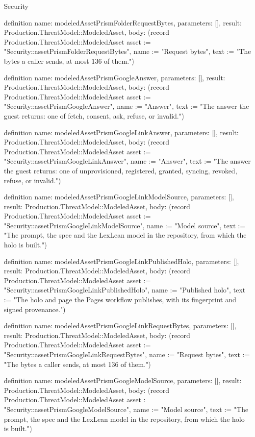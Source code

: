 \begin{lexlean}{Security}
\begin{semanticmodule}
definition{
  name: modeledAssetPrismFolderRequestBytes,
  parameters: [],
  result: Production.ThreatModel::ModeledAsset,
  body: (record Production.ThreatModel::ModeledAsset {asset := "Security::assetPrismFolderRequestBytes", name := "Request bytes", text := "The bytes a caller sends, at most 136 of them."})
}

definition{
  name: modeledAssetPrismGoogleAnswer,
  parameters: [],
  result: Production.ThreatModel::ModeledAsset,
  body: (record Production.ThreatModel::ModeledAsset {asset := "Security::assetPrismGoogleAnswer", name := "Answer", text := "The answer the guest returns: one of fetch, consent, ask, refuse, or invalid."})
}

definition{
  name: modeledAssetPrismGoogleLinkAnswer,
  parameters: [],
  result: Production.ThreatModel::ModeledAsset,
  body: (record Production.ThreatModel::ModeledAsset {asset := "Security::assetPrismGoogleLinkAnswer", name := "Answer", text := "The answer the guest returns: one of unprovisioned, registered, granted, syncing, revoked, refuse, or invalid."})
}

definition{
  name: modeledAssetPrismGoogleLinkModelSource,
  parameters: [],
  result: Production.ThreatModel::ModeledAsset,
  body: (record Production.ThreatModel::ModeledAsset {asset := "Security::assetPrismGoogleLinkModelSource", name := "Model source", text := "The prompt, the spec and the LexLean model in the repository, from which the holo is built."})
}

definition{
  name: modeledAssetPrismGoogleLinkPublishedHolo,
  parameters: [],
  result: Production.ThreatModel::ModeledAsset,
  body: (record Production.ThreatModel::ModeledAsset {asset := "Security::assetPrismGoogleLinkPublishedHolo", name := "Published holo", text := "The holo and page the Pages workflow publishes, with its fingerprint and signed provenance."})
}

definition{
  name: modeledAssetPrismGoogleLinkRequestBytes,
  parameters: [],
  result: Production.ThreatModel::ModeledAsset,
  body: (record Production.ThreatModel::ModeledAsset {asset := "Security::assetPrismGoogleLinkRequestBytes", name := "Request bytes", text := "The bytes a caller sends, at most 136 of them."})
}

definition{
  name: modeledAssetPrismGoogleModelSource,
  parameters: [],
  result: Production.ThreatModel::ModeledAsset,
  body: (record Production.ThreatModel::ModeledAsset {asset := "Security::assetPrismGoogleModelSource", name := "Model source", text := "The prompt, the spec and the LexLean model in the repository, from which the holo is built."})
}


\end{semanticmodule}
\end{lexlean}
